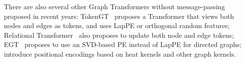 \documentclass[nohyperref, dvipsnames]{article}
\theoremstyle{plain}
\theoremstyle{definition}
\theoremstyle{remark}
\begin{document}
There are also several other Graph Transformers without message-passing proposed in recent years:
TokenGT~\cite{kim2022PureTransformersAre} proposes a Transformer that views both nodes and edges as tokens, and uses LapPE or  orthogonal random features; Relational Transformer~\citep{diao2022relational} also proposes to update both node and edge tokens;
EGT~\cite{hussain2022GlobalSelfAttentionReplacement} proposes to use an SVD-based PE instead of LapPE for directed graphs;
\cite{mialon2021GraphiTEncodingGraph, feldman2022weisfeiler} introduce positional encodings based on heat kernels and other graph kernels.
\end{document}
